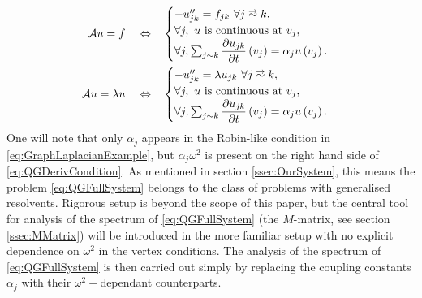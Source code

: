 \begin{align*}
	\mathcal{A}u = f \quad\Leftrightarrow\quad &
	\begin{cases}
		-u_{jk}'' = f_{jk} \ \forall j\conLeft k, \\
		\forall j, \ u \text{ is continuous at } v_j, \\
		\forall j, \sum_{j\con k}\pdiff{u_{jk}}{t}\bracs{v_j} = \alpha_j u\bracs{v_j}.
	\end{cases} \\
	\mathcal{A}u = \lambda u \quad\Leftrightarrow\quad &
	\begin{cases}
		-u_{jk}'' = \lambda u_{jk} \ \forall j\conLeft k, \\
		\forall j, \ u \text{ is continuous at } v_j, \\
		\forall j, \sum_{j\con k}\pdiff{u_{jk}}{t}\bracs{v_j} = \alpha_j u\bracs{v_j}.
	\end{cases}
\end{align*}
One will note that only $\alpha_j$ appears in the Robin-like condition in \eqref{eq:GraphLaplacianExample}, but $\alpha_j\omega^2$ is present on the right hand side of \eqref{eq:QGDerivCondition}.
As mentioned in section \ref{ssec:OurSystem}, this means the problem \eqref{eq:QGFullSystem} belongs to the class of problems with generalised resolvents.
Rigorous setup is beyond the scope of this paper, but the central tool for analysis of the spectrum of \eqref{eq:QGFullSystem} (the $M$-matrix, see section \ref{ssec:MMatrix}) will be introduced in the more familiar setup with no explicit dependence on $\omega^2$ in the vertex conditions.
The analysis of the spectrum of \eqref{eq:QGFullSystem} is then carried out simply by replacing the coupling constants $\alpha_j$ with their $\omega^2-$dependant counterparts.

